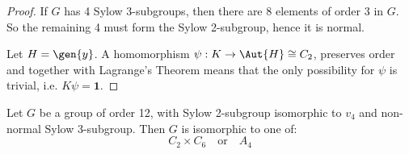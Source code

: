 \begin{proof}
    If \(G\) has 4 Sylow 3-subgroups, then there are 8 elements of order 3 in \(G\).
    So the remaining 4 must form the Sylow 2-subgroup, hence it is normal.

    Let \(H = \gen{y}\).
    A homomorphism \(\psi:K \to \Aut{H} \cong C_2\), preserves order and together with Lagrange's Theorem means that
    the only possibility for \(\psi\) is trivial, i.e. \(K\psi = \bm{1}\).
\end{proof}

\begin{lemma}
    Let \(G\) be a group of order 12, with Sylow 2-subgroup isomorphic to \(v_4\) and non-normal Sylow 3-subgroup.
    Then \(G\) is isomorphic to one of:
    \[
        C_{2} \times C_6 \quad \text{or} \quad%
        A_{4}
    \]
\end{lemma}

